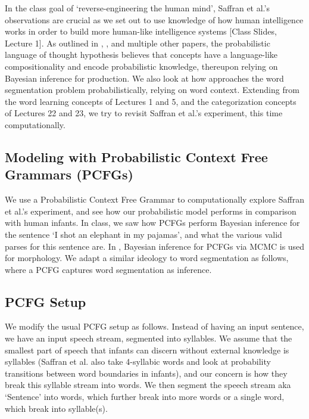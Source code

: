 \documentclass{article}
\begin{document}
In the class goal of `reverse-engineering the human mind', Saffran et al.'s observations are crucial as we set out to use knowledge of how human intelligence works in order to build more human-like intelligence systems [Class Slides, Lecture 1]. As outlined in \citet{Goodman2014ConceptsIA}, \citet{Goodmand&Tenenbaum2016}, \citet{Tenenbaum2012} and multiple other papers, the probabilistic language of thought hypothesis believes that concepts have a language-like compositionality and encode probabilistic knowledge, thereupon relying on Bayesian inference for production. We also look at how \citet{GOLDWATER200921} approaches the word segmentation problem probabilistically, relying on word context. Extending from the word learning concepts of Lectures 1 and 5, and the categorization concepts of Lectures 22 and 23, we try to revisit Saffran et al.'s experiment, this time computationally.
\subsection{Modeling with Probabilistic Context Free Grammars (PCFGs)}
We use a Probabilistic Context Free Grammar to computationally explore Saffran et al.'s experiment, and see how our probabilistic model performs in comparison with human infants. In class, we saw how PCFGs perform Bayesian inference for the sentence `I shot an elephant in my pajamas', and what the various valid parses for this sentence are. In \citet{Johnson2007BayesianIF}, Bayesian inference for PCFGs via MCMC is used for morphology. We adapt a similar ideology to word segmentation as follows, where a PCFG captures word segmentation as inference.

\subsection{PCFG Setup}
We modify the usual PCFG setup as follows. Instead of having an input sentence, we have an input speech stream, segmented into syllables. We assume that the smallest part of speech that infants can discern without external knowledge is syllables (Saffran et al. also take 4-syllabic words and look at probability transitions between word boundaries in infants), and our concern is how they break this syllable stream into words. We then segment the speech stream aka `Sentence' into words, which further break into more words or a single word, which break into syllable(s).
\end{document}
